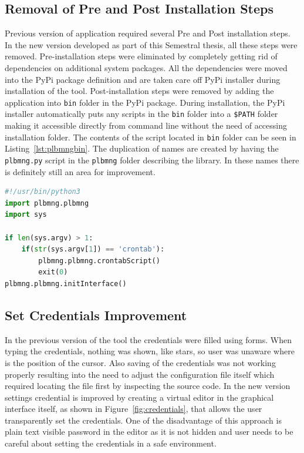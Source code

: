 \subsection{Removal of Pre and Post Installation Steps}
Previous version of application required several Pre and Post installation steps. In the new version developed as part of this Semestral thesis, all these steps were removed. Pre-installation steps were eliminated by completely getting rid of dependencies on additional system packages. All the dependencies were moved into the PyPi package definition and are taken care off PyPi installer during installation of the tool. Post-installation steps were removed by adding the application into \texttt{bin} folder in the PyPi package. During installation, the PyPi installer automatically puts any scripts in the \texttt{bin} folder into a \texttt{\$PATH} folder making it accessible directly from command line without the need of accessing installation folder. The contents of the script located in \texttt{bin} folder can be seen in Listing~\ref{lst:plbmngbin}. The duplication of names are created by having the \texttt{plbmng.py} script in the \texttt{plbmng} folder describing the library. In these names there is definitely still an area for improvement.

\begin{minipage}{\linewidth}
\begin{lstlisting}[language=Python, numbers=none, label={lst:plbmngbin}, caption=Plbmng Script Located in BIN, frame=single, showstringspaces=false, breaklines=true]
#!/usr/bin/python3
import plbmng.plbmng
import sys

if len(sys.argv) > 1:
	if(str(sys.argv[1]) == 'crontab'):
		plbmng.plbmng.crontabScript()
		exit(0)
plbmng.plbmng.initInterface()
\end{lstlisting}
\end{minipage}

\subsection{Set Credentials Improvement}
In the previous version of the tool the credentials were filled using forms. When typing the credentials, nothing was shown, like stars, so user was unaware where is the position of the cursor. Also saving of the credentials was not working properly resulting into the need to adjust the configuration file itself which required locating the file first by inspecting the source code. In the new version settings credential is improved by creating a virtual editor in the graphical interface itself, as shown in Figure~\ref{fig:credentials}, that allows the user transparently set the credentials. One of the disadvantage of this approach is plain text visible password in the editor as it is not hidden and user needs to be careful about setting the credentials in a safe environment.


